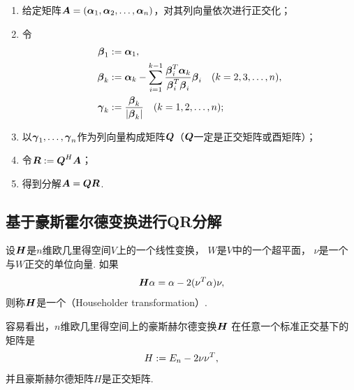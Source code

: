 \begin{algorithm}[简单QR分解]
\hfill
\begin{enumerate}
	\item 给定矩阵\(\boldsymbol{A} = (\boldsymbol\alpha_1,\boldsymbol\alpha_2,\dots,\boldsymbol\alpha_n)\)，对其列向量依次进行正交化；
	\item 令\begin{align*}
		\boldsymbol\beta_1
		&:= \boldsymbol\alpha_1, \\
		\boldsymbol\beta_k
		&:= \boldsymbol\alpha_k - \sum_{i=1}^{k-1} \frac{ \boldsymbol\beta_i^T \boldsymbol\alpha_k }{ \boldsymbol\beta_i^T \boldsymbol\beta_i } \boldsymbol\beta_i
		\quad(k=2,3,\dotsc,n), \\
		\boldsymbol\gamma_k
		&:= \frac{\boldsymbol\beta_k}{\abs{\boldsymbol\beta_k}}
		\quad(k=1,2,\dotsc,n);
	\end{align*}
	\item 以\(\boldsymbol\gamma_1,\dots,\boldsymbol\gamma_n\)作为列向量构成矩阵\(\boldsymbol{Q}\)（\(\boldsymbol{Q}\)一定是正交矩阵或酉矩阵）；
	\item 令\(\boldsymbol{R} := \boldsymbol{Q}^H \boldsymbol{A}\)；
	\item 得到分解\(\boldsymbol{A}=\boldsymbol{Q}\boldsymbol{R}\).
\end{enumerate}
\end{algorithm}

\subsection{基于豪斯霍尔德变换进行QR分解}
\begin{definition}
设\(\boldsymbol{H}\)是\(n\)维欧几里得空间\(V\)上的一个线性变换，
\(W\)是\(V\)中的一个超平面，
\(\nu\)是一个与\(W\)正交的单位向量.
如果\begin{equation*}
	\boldsymbol{H}\alpha
	= \alpha - 2 (\nu^T \alpha) \nu,
\end{equation*}
则称\(\boldsymbol{H}\)是一个（Householder transformation）.
\end{definition}
容易看出，\(n\)维欧几里得空间上的豪斯赫尔德变换\(\boldsymbol{H}\)
在任意一个标准正交基下的矩阵是\begin{equation*}
	H := E_n - 2 \nu \nu^T,
\end{equation*}
并且豪斯赫尔德矩阵\(H\)是正交矩阵.


